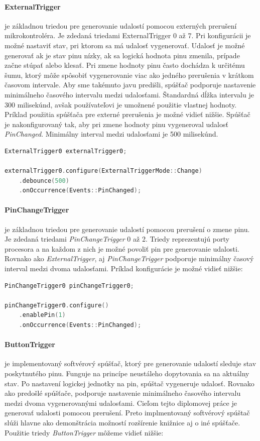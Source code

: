 \paragraph*{ExternalTrigger} \: je základnou triedou pre generovanie udalostí pomocou externých prerušení mikrokontroléra. Je zdedaná triedami ExternalTrigger 0 až 7.
Pri konfigurácii je možné nastaviť stav, pri ktorom sa má udalosť vygenerovať. Udalosť je možné generovať ak je stav pinu nízky, ak sa logická hodnota pinu zmenila, prípade
začne stúpať alebo klesať. Pri zmene hodnoty pinu často dochádza k určitému šumu, ktorý môže spôsobiť vygenerovanie viac ako jedného prerušenia v krátkom časovom intervale.
Aby sme takémuto javu predišli, spúšťač podporuje nastavenie minimálneho časového intervalu medzi udalosťami.
Štandardná dĺžka intervalu je 300 milisekúnd, avšak používateľovi je umožnené použitie vlastnej hodnoty.
Príklad použitia spúšťača pre externé prerušenia je možné vidieť nižšie. Spúšťač je nakonfigurovaný tak, aby pri zmene hodnoty pinu vygeneroval udalosť \textit{PinChanged}.
Minimálny interval medzi udalosťami je 500 milisekúnd.
\begin{lstlisting}[language=c++]      
ExternalTrigger0 externalTrigger0;

externalTrigger0.configure(ExternalTriggerMode::Change)
    .debounce(500)
    .onOccurrence(Events::PinChanged);
\end{lstlisting}

\paragraph*{PinChangeTrigger} \: je základnou triedou pre generovanie udalostí pomocou prerušení o zmene pinu. Je zdedaná triedami \textit{PinChangeTrigger} 0 až 2.
Triedy reprezentujú porty procesora a na každom z nich je možné povoliť pin pre generovanie udalosti. Rovnako ako \textit{ExternalTrigger}, aj \textit{PinChangeTrigger}
podporuje minimálny časový interval medzi dvoma udalosťami. Príklad konfigurácie je možné vidieť nižšie:
\begin{lstlisting}[language=c++]      
PinChangeTrigger0 pinChangeTrigger0;

pinChangeTrigger0.configure()
    .enablePin(1)
    .onOccurrence(Events::PinChanged);
\end{lstlisting}

\paragraph*{ButtonTrigger} \: je implementovaný softvérový spúšťač, ktorý pre generovanie udalostí sleduje stav poskytnutého pinu. Funguje na princípe neustáleho
dopytovania sa na aktuálny stav. Po nastavení logickej jednotky na pin, spúštač vygeneruje udalosť. Rovnako ako predošlé spúšťače, podporuje nastavenie minimálneho
časového intervalu medzi dvoma vygenerovanými udalosťami. Cieľom tejto diplomovej práce je generovať udalosti pomocou prerušení. Preto implmentovaný softvérový spúštač
slúži hlavne ako demonštrácia možností rozšírenie knižnice aj o iné spúšťače.
Použitie triedy \textit{ButtonTrigger} môžeme vidieť nižšie:


